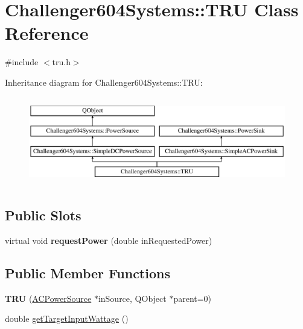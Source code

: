 \hypertarget{class_challenger604_systems_1_1_t_r_u}{\section{Challenger604\-Systems\-:\-:T\-R\-U Class Reference}
\label{class_challenger604_systems_1_1_t_r_u}
}


{\ttfamily \#include $<$tru.\-h$>$}

Inheritance diagram for Challenger604\-Systems\-:\-:T\-R\-U\-:\begin{figure}[H]
\begin{center}
\leavevmode
\includegraphics[height=3.902439cm]{class_challenger604_systems_1_1_t_r_u}
\end{center}
\end{figure}
\subsection*{Public Slots}
\begin{DoxyCompactItemize}
\item 
\hypertarget{class_challenger604_systems_1_1_t_r_u_a357a6361c26e37f21eff8da6295263a3}{virtual void {\bfseries request\-Power} (double in\-Requested\-Power)}\label{class_challenger604_systems_1_1_t_r_u_a357a6361c26e37f21eff8da6295263a3}

\end{DoxyCompactItemize}
\subsection*{Public Member Functions}
\begin{DoxyCompactItemize}
\item 
\hypertarget{class_challenger604_systems_1_1_t_r_u_a51fb2291fc0a2bfc4e057c3868ecf45b}{{\bfseries T\-R\-U} (\hyperlink{class_challenger604_systems_1_1_a_c_power_source}{A\-C\-Power\-Source} $\ast$in\-Source, Q\-Object $\ast$parent=0)}\label{class_challenger604_systems_1_1_t_r_u_a51fb2291fc0a2bfc4e057c3868ecf45b}

\item 
double \hyperlink{class_challenger604_systems_1_1_t_r_u_a2b023a31d9adcc544f793e8422519f9d}{get\-Target\-Input\-Wattage} ()
\end{DoxyCompactItemize}
